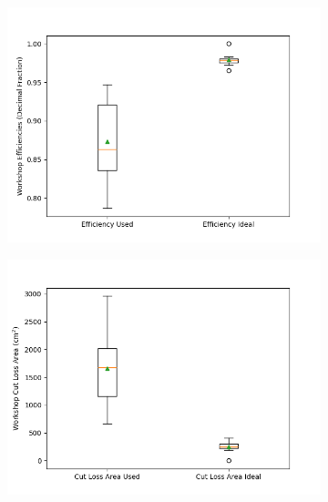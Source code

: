 \begin{figure}[H]
    \centering
    \begin{subfigure}[b]{0.45\textwidth}
        \centering
        \includegraphics[width=\textwidth]{Images/Workshop Efficiencies_Boxplot.png}
        \caption{}
        \label{fig:workshop_efficiency_boxplot}
    \end{subfigure}
    \begin{subfigure}[b]{0.45\textwidth}
        \centering
        \includegraphics[width=\textwidth]{Images/Workshop Cut Loss Area_Boxplot.png}
        \caption{}
        \label{fig:workshop_cut_loss_area}
    \end{subfigure}
    \caption{}
\end{figure}

